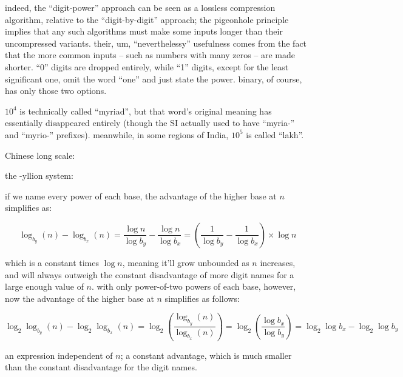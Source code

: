 \documentclass[../footnotes.tex]{subfiles}
\begin{document}

\myfootnote{} indeed, the ``digit-power'' approach can be seen as a lossless compression algorithm, relative to the ``digit-by-digit'' approach; the pigeonhole principle implies that any such algorithms must make some inputs longer than their uncompressed variants. their, um, ``neverthelessy'' usefulness comes from the fact that the more common inputs -- such as numbers with many zeros -- are made shorter. ``0'' digits are dropped entirely, while ``1'' digits, except for the least significant one, omit the word ``one'' and just state the power. binary, of course, has only those two options.

\myfootnote{} $10^4$ is technically called ``myriad'', but that word's original meaning has essentially disappeared entirely (though the SI actually used to have ``myria-'' and ``myrio-'' prefixes). meanwhile, in some regions of India, $10^5$ is called ``lakh''.

\myfootnote{} Chinese long scale: \\

\myfootnote{} the -yllion system: \\

\myfootnote{} if we name every power of each base, the advantage of the higher base at $n$ simplifies as:

\begin{equation*}
	  \log_{b_y}(n) - \log_{b_x}(n)
	= \frac{\log n}{\log b_y} - \frac{\log n}{\log b_x}
	= \left( \frac{1}{\log b_y} - \frac{1}{\log b_x} \right) \times \log n
\end{equation*}

which is a constant times $\log n$, meaning it'll grow unbounded as $n$ increases, and will always outweigh the constant disadvantage of more digit names for a large enough value of $n$. with only power-of-two powers of each base, however, now the advantage of the higher base at $n$ simplifies as follows:

\begin{equation*}
	  \log_2 \log_{b_y}(n) - \log_2 \log_{b_x}(n)
	= \log_2 \left( \frac{\log_{b_y}(n)}{\log_{b_x}(n)} \right)
	= \log_2 \left( \frac{\log b_x}{\log b_y} \right)
	= \log_2 \log b_x - \log_2 \log b_y
\end{equation*}

an expression independent of $n$; a constant advantage, which is much smaller than the constant disadvantage for the digit names.
\end{document}
